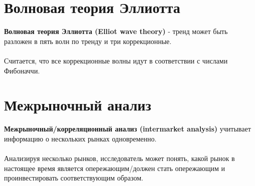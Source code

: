 \documentclass{article}
\begin{document}
\section{Волновая теория Эллиотта}
\textbf{Волновая теория Эллиотта (Elliot wave theory)} - тренд может быть разложен в пять волн по тренду и три коррекционные.\\\\
Считается, что все коррекционные волны идут в соответствии с числами Фибоначчи.
\section{Межрыночный анализ}
\textbf{Межрыночный/корреляционный анализ (intermarket analysis)} учитывает информацию о нескольких рынках одновременно.\\\\
Анализируя несколько рынков, исследователь может понять, какой рынок в настоящее время является опережающим/должен стать опережающим и проинвестировать соответствующим образом.
\end{document}
